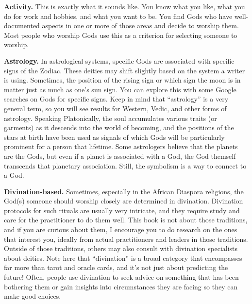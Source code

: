 \documentclass[
]{book}
\begin{document}
\textbf{Activity.} This is exactly what it sounds like. You know what you like, what you do for work and hobbies, and what you want to be. You find Gods who have well-documented aspects in one or more of those areas and decide to worship them. Most people who worship Gods use this as a criterion for selecting someone to worship.

\textbf{Astrology.} In astrological systems, specific Gods are associated with specific signs of the Zodiac. These deities may shift slightly based on the system a writer is using. Sometimes, the position of the rising sign or which sign the moon is in matter just as much as one's sun sign. You can explore this with some Google searches on Gods for specific signs. Keep in mind that ``astrology'' is a very general term, so you will see results for Western, Vedic, and other forms of astrology. Speaking Platonically, the soul accumulates various traits (or garments) as it descends into the world of becoming, and the positions of the stars at birth have been used as signals of which Gods will be particularly prominent for a person that lifetime. Some astrologers believe that the planets are the Gods, but even if a planet is associated with a God, the God themself transcends that planetary association. Still, the symbolism is a way to connect to a God.

\textbf{Divination-based.} Sometimes, especially in the African Diaspora religions, the God(s) someone should worship closely are determined in divination. Divination protocols for such rituals are usually very intricate, and they require study and care for the practitioner to do them well. This book is not about those traditions, and if you are curious about them, I encourage you to do research on the ones that interest you, ideally from actual practitioners and leaders in those traditions. Outside of those traditions, others may also consult with divination specialists about deities. Note here that ``divination'' is a broad category that encompasses far more than tarot and oracle cards, and it's not just about predicting the future! Often, people use divination to seek advice on something that has been bothering them or gain insights into circumstances they are facing so they can make good choices.
\end{document}
